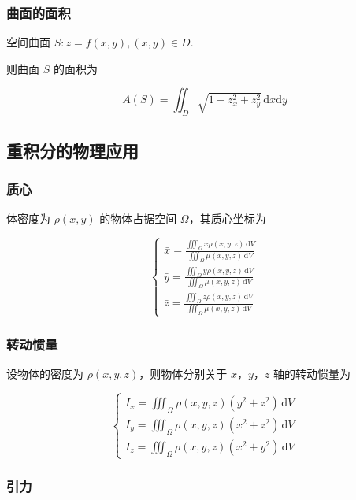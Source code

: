 \documentclass[lang = zh , final , oneside , openany , titlepage , zihao = -4 , linespread = 1.3 , baselineskip = false , cjk-font = windows , text-font = newtx , math-font = newtx , math-style = ISO , uppercase-greek = upright , integral-limits = false]{sjtureport}
\begin{document}
\subsubsection{曲面的面积}

空间曲面 \(S:z=f(x,y),(x,y)\in D\).

则曲面 \(S\) 的面积为

\[A(S) = \iint_D \sqrt{1+z_x^2+z_y^2}\,\mathrm{d}x\mathrm{d}y\]

\subsection{重积分的物理应用}

\subsubsection{质心}

体密度为 \(\rho(x, y)\) 的物体占据空间 \(\Omega\)，其质心坐标为

\[\left\{
\begin{aligned}
  \displaystyle\bar{x} = \frac{\iiint_\Omega x\rho(x,y,z)\,\mathrm{d}V}{\iiint_\Omega\mu(x,y,z)\,\mathrm{d}V} \\
  \displaystyle\bar{y} = \frac{\iiint_\Omega y\rho(x,y,z)\,\mathrm{d}V}{\iiint_\Omega\mu(x,y,z)\,\mathrm{d}V}\\
  \displaystyle\bar{z} = \frac{\iiint_\Omega z\rho(x,y,z)\,\mathrm{d}V}{\iiint_\Omega\mu(x,y,z)\,\mathrm{d}V}
\end{aligned}\right.
\]

\subsubsection{转动惯量}\label{ux8f6cux52a8ux60efux91cf}

设物体的密度为 \(\rho(x,y,z)\)，则物体分别关于 \(x\)，\(y\)，\(z\)
轴的转动惯量为

\[\left\{\begin{aligned}
  I_x = \iiint_\Omega \rho(x,y,z)(y^2+z^2)\,\mathrm{d}V\\
  I_y = \iiint_\Omega \rho(x,y,z)(x^2+z^2)\,\mathrm{d}V\\
  I_z = \iiint_\Omega \rho(x,y,z)(x^2+y^2)\,\mathrm{d}V
\end{aligned}\right.\]

\subsubsection{引力}
\end{document}
